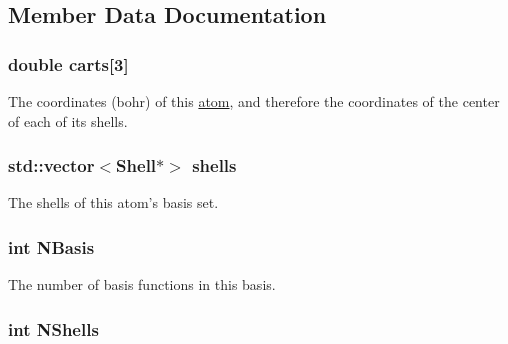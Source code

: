 \subsection{Member Data Documentation}
\hypertarget{classJKBuilder_1_1AtomicBasisSet_a6b5adb6f3635311b52c7a7a35dcb01b4}{
\subsubsection[{carts}]{\setlength{\rightskip}{0pt plus 5cm}double {\bf carts}\mbox{[}3\mbox{]}}}
\label{classJKBuilder_1_1AtomicBasisSet_a6b5adb6f3635311b52c7a7a35dcb01b4}


The coordinates (bohr) of this \hyperlink{classJKBuilder_1_1atom}{atom}, and therefore the coordinates of the center of each of its shells. \hypertarget{classJKBuilder_1_1AtomicBasisSet_a26a4de72845629b10ccfa84bf3b27790}{
\subsubsection[{shells}]{\setlength{\rightskip}{0pt plus 5cm}std::vector$<${\bf Shell}$\ast$$>$ {\bf shells}}}
\label{classJKBuilder_1_1AtomicBasisSet_a26a4de72845629b10ccfa84bf3b27790}


The shells of this atom's basis set. \hypertarget{classJKBuilder_1_1BasisSet_a41e2bc1e52da2859eabe6586e4451663}{
\subsubsection[{NBasis}]{\setlength{\rightskip}{0pt plus 5cm}int {\bf NBasis}}}
\label{classJKBuilder_1_1BasisSet_a41e2bc1e52da2859eabe6586e4451663}


The number of basis functions in this basis. \hypertarget{classJKBuilder_1_1BasisSet_a9f13901f058284051a35aabd9d69c6d5}{
\subsubsection[{NShells}]{\setlength{\rightskip}{0pt plus 5cm}int {\bf NShells}}}
\label{classJKBuilder_1_1BasisSet_a9f13901f058284051a35aabd9d69c6d5}


